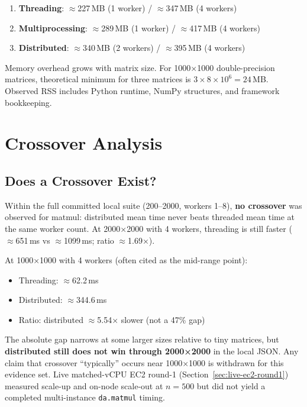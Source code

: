 \begin{enumerate}
    \item \textbf{Threading}: $\approx$227\,MB (1 worker) / $\approx$347\,MB (4 workers)
    \item \textbf{Multiprocessing}: $\approx$289\,MB (1 worker) / $\approx$417\,MB (4 workers)
    \item \textbf{Distributed}: $\approx$340\,MB (2 workers) / $\approx$395\,MB (4 workers)
\end{enumerate}

Memory overhead grows with matrix size. For 1000×1000 double-precision matrices, theoretical minimum for three matrices is $3\times8\times10^6 = 24$\,MB. Observed RSS includes Python runtime, NumPy structures, and framework bookkeeping.

\section{Crossover Analysis}

\subsection{Does a Crossover Exist?}

Within the full committed local suite (200--2000, workers 1--8), \textbf{no crossover} was observed for matmul: distributed mean time never beats threaded mean time at the same worker count. At 2000×2000 with 4 workers, threading is still faster ($\approx$651\,ms vs $\approx$1099\,ms; ratio $\approx$1.69×).

At 1000×1000 with 4 workers (often cited as the mid-range point):
\begin{itemize}
    \item Threading: $\approx$62.2\,ms
    \item Distributed: $\approx$344.6\,ms
    \item Ratio: distributed $\approx$5.54× slower (not a 47\% gap)
\end{itemize}

The absolute gap narrows at some larger sizes relative to tiny matrices, but \textbf{distributed still does not win through 2000×2000} in the local JSON. Any claim that crossover ``typically'' occurs near 1000×1000 is withdrawn for this evidence set. Live matched-vCPU EC2 round-1 (Section~\ref{sec:live-ec2-round1}) measured scale-up and on-node scale-out at $n{=}500$ but did not yield a completed multi-instance \texttt{da.matmul} timing.

